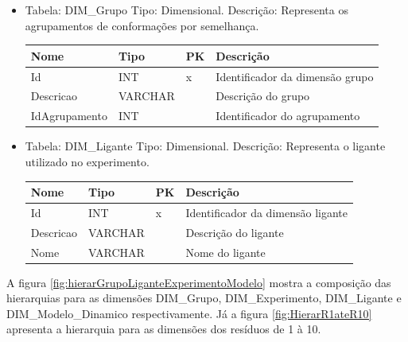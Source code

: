 \begin{itemize}
\begin{itemize}
\item 
Tabela: DIM_Grupo
Tipo: Dimensional.
Descrição: Representa os agrupamentos de conformações por semelhança.
\begin{table}[h]
\begin{tabular}{@{}llll@{}}
\toprule
\textbf{Nome} & \textbf{Tipo} & \textbf{PK} & \textbf{Descrição}           \\ \midrule
Id            & INT           & x           & Identificador da dimensão grupo    \\
Descricao     & VARCHAR       &             & Descrição do grupo           \\
IdAgrupamento & INT           &             & Identificador do agrupamento \\ \bottomrule
\end{tabular}
\end{table}

\item
Tabela: DIM_Ligante
Tipo: Dimensional.
Descrição: Representa o ligante utilizado no experimento.
\begin{table}[h]
\begin{tabular}{@{}llll@{}}
\toprule
\textbf{Nome} 	& \textbf{Tipo} & \textbf{PK} & \textbf{Descrição}           \\ \midrule
Id            	& INT           & x           & Identificador da dimensão ligante   \\
Descricao     	& VARCHAR       &             & Descrição do ligante           \\
Nome 			& VARCHAR       &             & Nome do ligante \\ \bottomrule
\end{tabular}
\end{table}

\end{itemize}







A figura \ref{fig:hierarGrupoLiganteExperimentoModelo} mostra a composição das hierarquias para as dimensões DIM\_Grupo, DIM\_Experimento, DIM\_Ligante e DIM\_Modelo\_Dinamico respectivamente. Já a figura \ref{fig:HierarR1ateR10} apresenta a hierarquia para as dimensões dos resíduos de 1 à 10.


\end{itemize}
